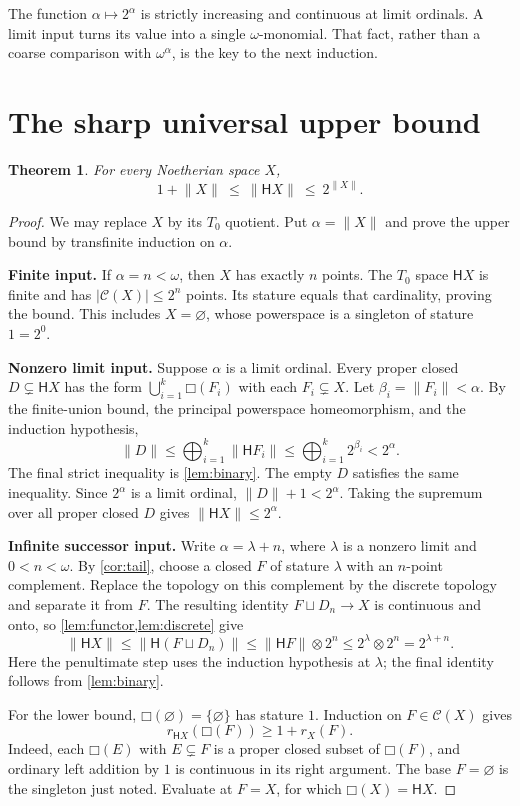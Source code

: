 \documentclass[11pt,a4paper]{article}
\newtheorem{theorem}{Theorem}[section]
\theoremstyle{definition}
\newcommand{\Cl}{\mathcal C}
\newcommand{\HH}{\mathsf H}
\newcommand{\st}[1]{\lVert #1\rVert}
\newcommand{\boxF}[1]{\mathord{\Box}(#1)}
\newcommand{\ds}{\mathbin{\sqcup}}
\newcommand{\natsum}{\mathop{\bigoplus}}
\numberwithin{equation}{section}
\begin{document}
The function $\alpha\mapsto2^\alpha$ is strictly increasing and continuous
at limit ordinals.  A limit input turns its value into a single
$\omega$-monomial.  That fact, rather than a coarse comparison with
$\omega^\alpha$, is the key to the next induction.

\section{The sharp universal upper bound}
\label{sec:upper}

\begin{theorem}\label{thm:upper}
For every Noetherian space $X$,
\begin{equation}\label{eq:mainbound}
 1+\st X\ \leq\ \st{\HH X}\ \leq\ 2^{\st X}.
\end{equation}
\end{theorem}
\begin{proof}
We may replace $X$ by its $T_0$ quotient.  Put $\alpha=\st X$ and prove
the upper bound by transfinite induction on $\alpha$.

\textbf{Finite input.}
If $\alpha=n<\omega$, then $X$ has exactly $n$ points.  The $T_0$ space
$\HH X$ is finite and has $|\Cl(X)|\leq2^n$ points.  Its stature equals
that cardinality, proving the bound.  This includes $X=\varnothing$,
whose powerspace is a singleton of stature $1=2^0$.

\textbf{Nonzero limit input.}
Suppose $\alpha$ is a limit ordinal.  Every proper closed
$D\subsetneq\HH X$ has the form
$\bigcup_{i=1}^k\boxF{F_i}$ with each $F_i\subsetneq X$.
Let $\beta_i=\st{F_i}<\alpha$.  By the finite-union bound, the principal
powerspace homeomorphism, and the induction hypothesis,
\[
 \st D\leq\natsum_{i=1}^k\st{\HH F_i}
       \leq\natsum_{i=1}^k2^{\beta_i}<2^\alpha.
\]
The final strict inequality is \cref{lem:binary}.  The empty $D$ satisfies
the same inequality.  Since $2^\alpha$ is a limit ordinal,
$\st D+1<2^\alpha$.  Taking the supremum over all proper closed $D$ gives
$\st{\HH X}\leq2^\alpha$.

\textbf{Infinite successor input.}
Write $\alpha=\lambda+n$, where $\lambda$ is a nonzero limit and
$0<n<\omega$.  By \cref{cor:tail}, choose a closed $F$ of stature
$\lambda$ with an $n$-point complement.  Replace the topology on this
complement by the discrete topology and separate it from $F$.  The
resulting identity $F\ds D_n\to X$ is continuous and onto, so
\cref{lem:functor,lem:discrete} give
\[
 \st{\HH X}\leq\st{\HH(F\ds D_n)}
 \leq\st{\HH F}\otimes2^n
 \leq2^\lambda\otimes2^n
 =2^{\lambda+n}.
\]
Here the penultimate step uses the induction hypothesis at $\lambda$;
the final identity follows from \cref{lem:binary}.

For the lower bound, $\boxF\varnothing=\{\varnothing\}$ has stature
$1$.  Induction on $F\in\Cl(X)$ gives
\[
 r_{\HH X}(\boxF F)\geq1+r_X(F).
\]
Indeed, each $\boxF E$ with $E\subsetneq F$ is a proper closed subset
of $\boxF F$, and ordinary left addition by $1$ is continuous in its
right argument.  The base $F=\varnothing$ is the singleton just noted.
Evaluate at $F=X$, for which $\boxF X=\HH X$.
\end{proof}
\end{document}
